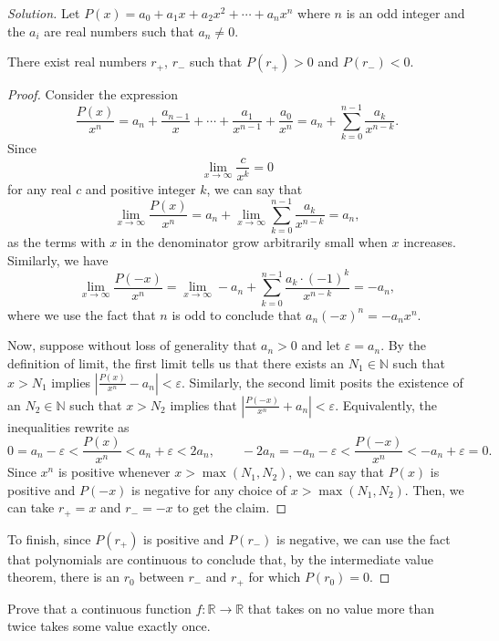 \documentclass[11pt]{scrartcl}
\providecommand{\eps}{\varepsilon}
\providecommand{\NN}{\mathbb N}
\providecommand{\RR}{\mathbb R}
\theoremstyle{problem}
\newenvironment{problem}[1]
{\renewcommand\theinnercustomthm{#1}\innercustomthm}
{\endinnercustomthm}
\theoremstyle{remark}
\newenvironment{soln}{\begin{proof}[Solution]}{\end{proof}}
\providecommand{\abs}[1]{\left|#1\right|}
\begin{document}
\begin{soln}
	Let $P(x) = a_0 + a_1x + a_2x^2 + \cdots + a_nx^n$
	where $n$ is an odd integer and the $a_i$ are real numbers
	such that $a_n\ne 0$.
	
	\begin{claim*}
		There exist real numbers $r_+$, $r_-$
		such that $P(r_+) > 0$ and $P(r_-) < 0$.
	\end{claim*}
	\begin{proof}
		Consider the expression
		\[\frac{P(x)}{x^n} = a_n + \frac{a_{n-1}}{x}
		+ \cdots + \frac{a_1}{x^{n-1}} + \frac{a_0}{x^n}
		= a_n +  \sum_{k=0}^{n-1} \frac{a_k}{x^{n-k}}.\]
		Since
		\[\lim_{x\to\infty} \frac{c}{x^k} = 0\]
		for any real $c$ and positive integer $k$, we can say that
		\[\lim_{x\to\infty} \frac{P(x)}{x^n} = a_n
		+ \lim_{x\to\infty}  \sum_{k=0}^{n-1} \frac{a_k}{x^{n-k}} = a_n,\]
		as the terms with $x$ in the denominator
		grow arbitrarily small when $x$ increases.
		Similarly, we have
		\[\lim_{x\to\infty} \frac{P(-x)}{x^n} =
		\lim_{x\to\infty} -a_n + \sum_{k=0}^{n-1} \frac{a_k\cdot(-1)^k}{x^{n-k}}
		= -a_n,
		\]
		where we use the fact that $n$ is odd to conclude that
		$a_n(-x)^n = -a_nx^n$.
		
		Now, suppose without loss of generality
		that $a_n > 0$ and let $\eps = a_n$.
		By the definition of limit, the first limit tells us that
		there exists an $N_1\in\NN$ such that
		$x > N_1$ implies $\abs{\frac{P(x)}{x^n} - a_n} < \eps$.
		Similarly, the second limit posits the existence of an $N_2\in\NN$
		such that $x > N_2$ implies that $\abs{\frac{P(-x)}{x^n} + a_n} < \eps$.
		Equivalently, the inequalities rewrite as
		\[0 = a_n - \eps < \frac{P(x)}{x^n} < a_n + \eps < 2a_n,\qquad
		-2a_n = -a_n - \eps < \frac{P(-x)}{x^n} < -a_n + \eps = 0.\]
		Since $x^n$ is positive whenever $x > \max(N_1, N_2)$,
		we can say that $P(x)$ is positive and $P(-x)$ is negative
		for any choice of $x > \max(N_1, N_2)$.
		Then, we can take $r_+ = x$ and $r_- = -x$ to get the claim.
	\end{proof}
	
	To finish, since $P(r_+)$ is positive and $P(r_-)$ is negative,
	we can use the fact that polynomials are continuous
	to conclude that, by the intermediate value theorem,
	there is an $r_0$ between $r_-$ and $r_+$
	for which $P(r_0) = 0$.
\end{soln}

\begin{problem}{3}
	Prove that a continuous function $f:\RR\to\RR$
	that takes on no value more than twice
	takes some value exactly once.
\end{problem}
\end{document}
